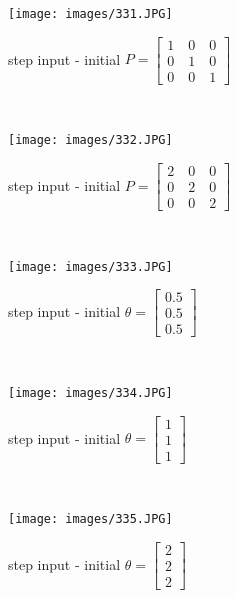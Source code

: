 \documentclass[11pt]{scrartcl} %
\begin{document}
\begin{figure}[H]
	\centering
	\texttt{[image: images/331.JPG]}
	\caption{step input - initial $P = \left[\begin{array}{l}
1 \quad 0 \quad 0 \\
0 \quad 1 \quad 0\\
0 \quad 0 \quad 1
\end{array}\right]$}
\end{figure}\\

\begin{figure}[H]
	\centering
	\texttt{[image: images/332.JPG]}
	\caption{step input - initial $P = \left[\begin{array}{l}
2 \quad 0 \quad 0 \\
0 \quad 2 \quad 0\\
0 \quad 0 \quad 2
\end{array}\right]$}
\end{figure}\\

\begin{figure}[H]
	\centering
	\texttt{[image: images/333.JPG]}
	\caption{step input - initial $\theta = \left[\begin{array}{l}
0.5 \\
0.5 \\
0.5 
\end{array}\right]$}
\end{figure}\\

\begin{figure}[H]
	\centering
	\texttt{[image: images/334.JPG]}
	\caption{step input - initial $\theta = \left[\begin{array}{l}
1 \\
1 \\
1 
\end{array}\right]$}
\end{figure}\\

\begin{figure}[H]
	\centering
	\texttt{[image: images/335.JPG]}
	\caption{step input - initial $\theta = \left[\begin{array}{l}
2 \\
2 \\
2 
\end{array}\right]$}
\end{figure}\\
\end{document}
